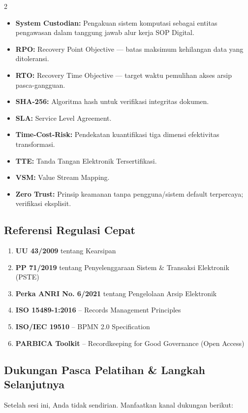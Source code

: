 \documentclass[11pt,a4paper]{article}
\begin{document}
\begin{multicols}{2}
\begin{itemize}[leftmargin=*, nosep]
    \item \textbf{System Custodian:} Pengakuan sistem komputasi sebagai entitas pengawasan dalam tanggung jawab alur kerja SOP Digital.
    \item \textbf{RPO:} Recovery Point Objective --- batas maksimum kehilangan data yang ditoleransi.
    \item \textbf{RTO:} Recovery Time Objective --- target waktu pemulihan akses arsip pasca-gangguan.
    \item \textbf{SHA-256:} Algoritma hash untuk verifikasi integritas dokumen.
    \item \textbf{SLA:} Service Level Agreement.
    \item \textbf{Time-Cost-Risk:} Pendekatan kuantifikasi tiga dimensi efektivitas transformasi.
    \item \textbf{TTE:} Tanda Tangan Elektronik Tersertifikasi.
    \item \textbf{VSM:} Value Stream Mapping.
    \item \textbf{Zero Trust:} Prinsip keamanan tanpa pengguna/sistem default terpercaya; verifikasi eksplisit.
\end{itemize}
\end{multicols}

\subsection{Referensi Regulasi Cepat}
\begin{enumerate}[nosep]
    \item \textbf{UU 43/2009} tentang Kearsipan
    \item \textbf{PP 71/2019} tentang Penyelenggaraan Sistem \& Transaksi Elektronik (PSTE)
    \item \textbf{Perka ANRI No. 6/2021} tentang Pengelolaan Arsip Elektronik
    \item \textbf{ISO 15489-1:2016} -- Records Management Principles
    \item \textbf{ISO/IEC 19510} -- BPMN 2.0 Specification
    \item \textbf{PARBICA Toolkit} -- Recordkeeping for Good Governance (Open Access)
\end{enumerate}

\subsection{Dukungan Pasca Pelatihan \& Langkah Selanjutnya}
Setelah sesi ini, Anda tidak sendirian. Manfaatkan kanal dukungan berikut:
\end{document}
